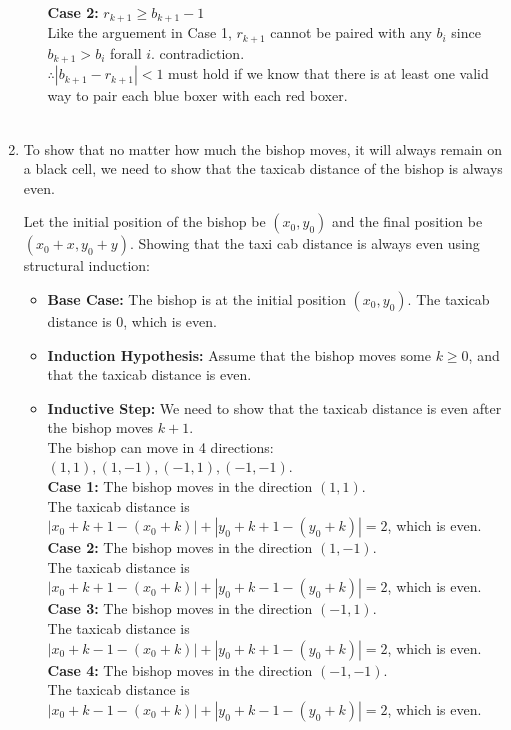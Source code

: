 \documentclass[a4paper]{article}
\begin{document}
\begin{enumerate}
\begin{itemize}
            \textbf{Case 2:} $r_{k+1} \ge b_{k+1} - 1$ \\
            Like the arguement in Case 1, $r_{k+1}$ cannot be paired with any $b_i$ since $b_{k+1} > b_i$ forall $i$. contradiction. \\

            $\therefore |b_{k+1} - r_{k+1}| < 1$ must hold if we know that there is at least one valid way to pair each blue boxer with each red boxer. \\ \\

        \end{itemize}

        \item To show that no matter how much the bishop moves, it will always remain on a black cell, we need to show that the taxicab distance of the bishop is always even.
        
        Let the initial position of the bishop be $(x_0, y_0)$ and the final position be $(x_0 + x, y_0 + y)$. Showing that the taxi cab distance is always even using structural induction: \\
        
        \begin{itemize}
            \item \textbf{Base Case:} The bishop is at the initial position $(x_0, y_0)$. The taxicab distance is 0, which is even. \\
            \item \textbf{Induction Hypothesis:} Assume that the bishop moves some $k \ge 0$, and that the taxicab distance is even. \\
            \item \textbf{Inductive Step:} We need to show that the taxicab distance is even after the bishop moves $k+1$. \\
            The bishop can move in 4 directions: $(1, 1), (1, -1), (-1, 1), (-1, -1)$. \\
            \textbf{Case 1:} The bishop moves in the direction $(1, 1)$. \\
            The taxicab distance is $|x_0 + k + 1 - (x_0 + k)| + |y_0 + k + 1 - (y_0 + k)| = 2$, which is even. \\
            \textbf{Case 2:} The bishop moves in the direction $(1, -1)$. \\
            The taxicab distance is $|x_0 + k + 1 - (x_0 + k)| + |y_0 + k - 1 - (y_0 + k)| = 2$, which is even. \\
            \textbf{Case 3:} The bishop moves in the direction $(-1, 1)$. \\
            The taxicab distance is $|x_0 + k - 1 - (x_0 + k)| + |y_0 + k + 1 - (y_0 + k)| = 2$, which is even. \\
            \textbf{Case 4:} The bishop moves in the direction $(-1, -1)$. \\
            The taxicab distance is $|x_0 + k - 1 - (x_0 + k)| + |y_0 + k - 1 - (y_0 + k)| = 2$, which is even. \\
        \end{itemize}


\end{enumerate}
\end{document}
